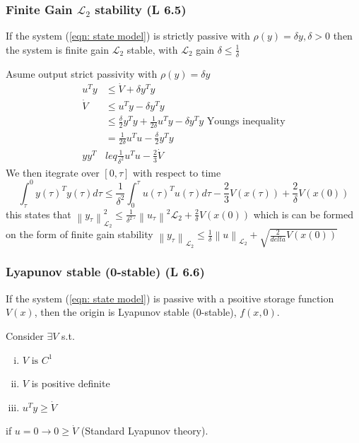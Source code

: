 \documentclass{article}
\begin{document}
\subsubsection{Finite Gain $\mathcal{L}_2$ stability (L 6.5)}
If the system (\ref{eqn: state model}) is strictly passive with $\rho (y) = \delta y, \delta > 0$ then the system is finite gain $\mathcal{L}_2$ stable, with $\mathcal{L}_2$ gain $\delta \leq \frac{1}{\delta}$
\begin{frm-prf}
	Asume output strict passivity with $\rho (y) = \delta y$
	\begin{equation}
		\begin{split}
			u^{T}y &\leq  \dot V + \delta y^{T}y \\
			\dot V & \leq u^{T}y - \delta y^{T}y \\
			& \leq \frac{\delta }{2}y^{T}y + \frac{1}{2 \delta} u^{T}y - \delta y^{T}y \text{ Youngs inequality}\\
			&= \frac{1}{2 \delta }u^{T}u - \frac{\delta }{2}y^{T}y \\
			y y^{T}  & leq \frac{1}{\delta ^{2}}u^{T}u - \frac{2}{3}\dot V 
		\end{split}
	\end{equation}
	We then itegrate over $[0, \tau ]$ with respect to time
	\begin{equation}
		\int_{\tau}^{0} y(\tau)^T y(\tau) d \tau \leq \frac{1}{\delta ^{2}} \int_{0}^{\tau} u(\tau)^T u(\tau) d \tau - \frac{2}{3} V(x(\tau)) + \frac{2}{\delta } V(x(0))
	\end{equation}
	this states that $\left\| y_\tau  \right\|_{\mathcal{L}_2} ^{2} \leq \frac{1}{\delta ^{2}´} \left\| u_\tau  \right\|^2{\mathcal{L}_2} + \frac{2}{\delta } V(x(0))$ which is can be formed on the form of finite gain stability $\left\| y_\tau \right\|_{\mathcal{L}_2} \leq \frac{1}{\delta } \left\| u \right\| _{\mathcal{L}_2} + \sqrt{\frac{2}{delta}V(x(0))} $
\end{frm-prf}
\subsubsection{Lyapunov stable (0-stable) (L 6.6)}
If the system (\ref{eqn: state model}) is passive with a psoitive storage function $V(x)$, then the origin is Lyapunov stable (0-stable), $f(x,0)$.
\begin{frm-prf}
	Consider $\exists V$ s.t.
	\begin{enumerate}[i)]
		\item $V \text{ is } C^1$
		\item $V$ is positive definite
		\item $u^{T}y \geq \dot V$
	\end{enumerate}
	if $u = 0 \to 0 \geq \dot{V}$ (Standard Lyapunov theory).
\end{frm-prf}
\end{document}
